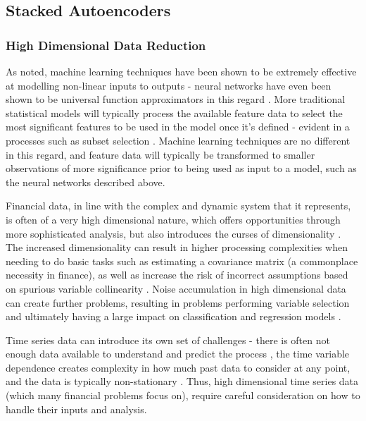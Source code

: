 \documentclass[a4paper,11pt,oneside]{article}
\theoremstyle{plain}
\theoremstyle{definition}
\begin{document}
	
	\subsection{Stacked Autoencoders}\label{lr_SAE}
	
	\subsubsection{High Dimensional Data Reduction}\label{HDDR}
	
	As noted, machine learning techniques have been shown to be extremely effective at modelling non-linear inputs 
	to outputs - neural networks have even been shown to be universal function approximators in this regard \cite{Hornik}. 
	More traditional statistical models will typically process the available feature data to select the most significant 
	features to be used in the model once it’s defined - evident in a processes such as subset selection \cite{Schaefer}. 
	Machine learning techniques are no different in this regard, and feature data will typically be transformed to smaller 
	observations of more significance prior to being used as input to a model, such as the neural networks described above.
	\hfill \break 
	
	Financial data, in line with the complex and dynamic system that it represents, is often of a very high dimensional 
	nature, which offers opportunities through more sophisticated analysis, but also introduces the curses of
	dimensionality \cite{Donoho}. The increased dimensionality can result in higher processing complexities when needing to 
	do basic tasks such as estimating a covariance matrix (a commonplace necessity in finance), as well as increase 
	the risk of incorrect assumptions based on spurious variable collinearity \cite{Fan1}. Noise accumulation in high 
	dimensional data can create further problems, resulting in problems performing variable selection and ultimately 
	having a large impact on classification and regression models \cite{Fan2}.
	\hfill \break 
	
	Time series data can introduce its own set of challenges - there is often not enough data available to understand 
	and predict the process \cite{Fama}, the time variable dependence creates complexity in how much past 
	data to consider at any point, and the data is typically non-stationary \cite{Langkvist}. Thus, high dimensional time 
	series data (which many financial problems focus on), require careful consideration on how to handle their inputs 
	and analysis.
	\hfill \break 
	
\end{document}
